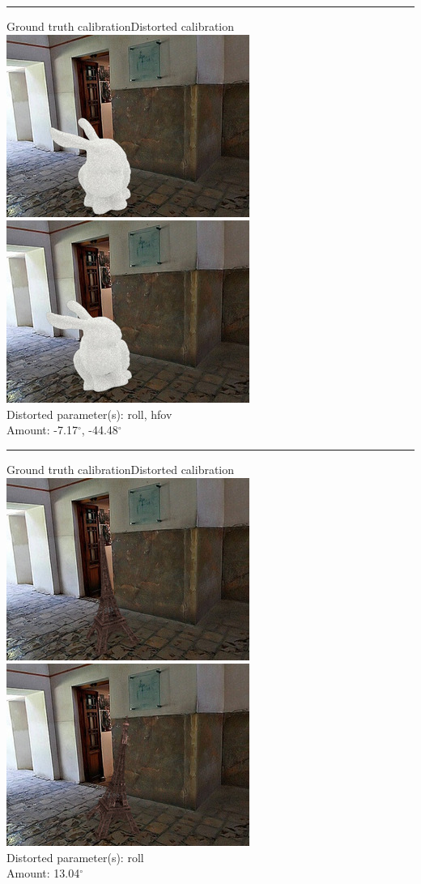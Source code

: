 \begin{minipage}{\linewidth}
\centering
\hrule\vspace{1em}
Ground truth calibration\hspace{0.2\linewidth}Distorted calibration\\\vspace{0.5em}
\includegraphics[width=0.45\linewidth]{study/thumb/pano_ahxngimugqzaln-1_5_gt.jpg}
\includegraphics[width=0.45\linewidth]{study/thumb/pano_ahxngimugqzaln-1_5_dc.jpg}\\
Distorted parameter(s): roll, hfov\\
Amount: -7.17$^\circ$, -44.48$^\circ$
\end{minipage}

\begin{minipage}{\linewidth}
\centering
\hrule\vspace{1em}
Ground truth calibration\hspace{0.2\linewidth}Distorted calibration\\\vspace{0.5em}
\includegraphics[width=0.45\linewidth]{study/thumb/pano_ahxngimugqzaln-1_6_gt.jpg}
\includegraphics[width=0.45\linewidth]{study/thumb/pano_ahxngimugqzaln-1_6_dc.jpg}\\
Distorted parameter(s): roll\\
Amount: 13.04$^\circ$
\end{minipage}

